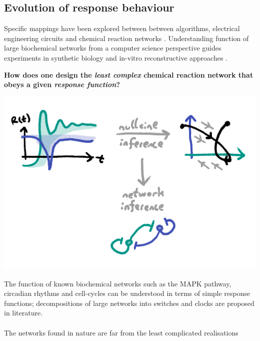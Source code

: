 \documentclass[a0,portrait]{a0poster}
\begin{document}
\begin{multicols}{3} %

\section{Evolution of response behaviour}

Specific mappings have been explored between between algorithms, electrical
engineering circuits and chemical reaction networks \cite{}. Understanding function
of large biochemical networks from a computer science perspective guides experiments
in synthetic biology and in-vitro reconstructive approaches \cite{}.
\\
\begin{tcolorbox}[boxrule=2pt,arc=3.4pt,boxsep=2mm]
\begin{center}\color{DarkRed}
\textbf{How does one design the \textit{least complex} chemical
reaction network that obeys a given \textit{response function}?}
\end{center}
\end{tcolorbox}
\begin{center}
\includegraphics[width=1.0\linewidth]{inference}
\end{center}\noindent
The function of known biochemical networks such as the MAPK pathway,
circadian rhythms and cell-cycles can be understood in terms of simple
response functions; decompositions of large networks into switches and
clocks are proposed in literature.
\\\\
The networks found in nature are far from the least complicated realisations

\end{multicols}
\end{document}
